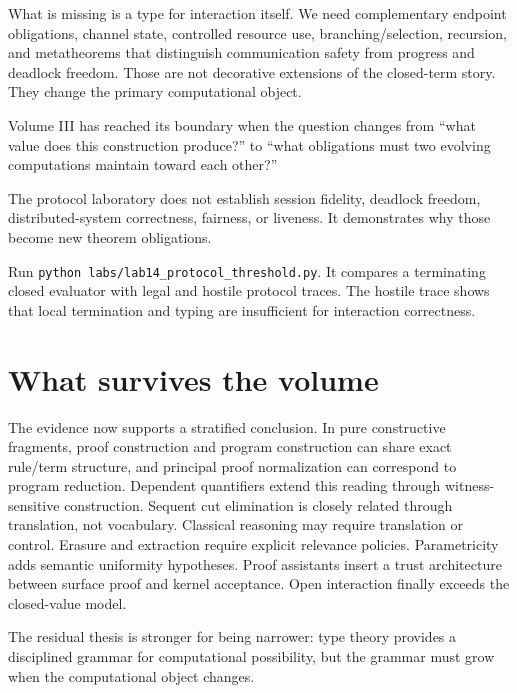 

What is missing is a type for interaction itself. We need complementary endpoint obligations, channel state, controlled resource use, branching/selection, recursion, and metatheorems that distinguish communication safety from progress and deadlock freedom. Those are not decorative extensions of the closed-term story. They change the primary computational object.



\begin{principle}
Volume III has reached its boundary when the question changes from “what value does this construction produce?” to “what obligations must two evolving computations maintain toward each other?”
\end{principle}

\begin{warningbox}
The protocol laboratory does not establish session fidelity, deadlock freedom, distributed-system correctness, fairness, or liveness. It demonstrates why those become new theorem obligations.
\end{warningbox}

\begin{labbox}
Run \texttt{python labs/lab14_protocol_threshold.py}. It compares a terminating closed evaluator with legal and hostile protocol traces. The hostile trace shows that local termination and typing are insufficient for interaction correctness.
\end{labbox}

\section{What survives the volume}
The evidence now supports a stratified conclusion. In pure constructive fragments, proof construction and program construction can share exact rule/term structure, and principal proof normalization can correspond to program reduction. Dependent quantifiers extend this reading through witness-sensitive construction. Sequent cut elimination is closely related through translation, not vocabulary. Classical reasoning may require translation or control. Erasure and extraction require explicit relevance policies. Parametricity adds semantic uniformity hypotheses. Proof assistants insert a trust architecture between surface proof and kernel acceptance. Open interaction finally exceeds the closed-value model.

The residual thesis is stronger for being narrower: type theory provides a disciplined grammar for computational possibility, but the grammar must grow when the computational object changes.

